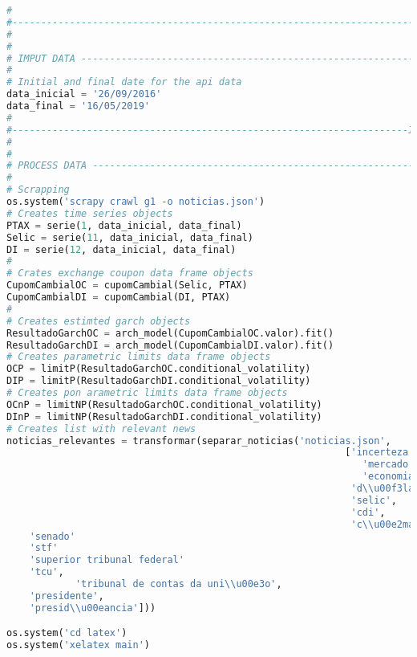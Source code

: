 \begin{lstlisting}[language=Python]
#
#------------------------------------------------------------------------OBJECTS
#
#
# IMPUT DATA -------------------------------------------------------------------
#
# Initial and final date for the api data
data_inicial = '26/09/2016'
data_final = '16/05/2019'
#
#---------------------------------------------------------------------INPUT DATA
#
#
# PROCESS DATA -----------------------------------------------------------------
#
# Scrapping
os.system('scrapy crawl g1 -o noticias.json')
# Creates time series objects
PTAX = serie(1, data_inicial, data_final)
Selic = serie(11, data_inicial, data_final)
DI = serie(12, data_inicial, data_final)
#
# Crates exchange coupon data frame objects
CupomCambialOC = cupomCambial(Selic, PTAX)
CupomCambialDI = cupomCambial(DI, PTAX)
#
# Creates estimted garch objects
ResultadoGarchOC = arch_model(CupomCambialOC.valor).fit()
ResultadoGarchDI = arch_model(CupomCambialDI.valor).fit()
# Creates parametric limits data frame objects
OCP = limitP(ResultadoGarchOC.conditional_volatility)
DIP = limitP(ResultadoGarchDI.conditional_volatility)
# Creates pon arametric limits data frame objects
OCnP = limitNP(ResultadoGarchOC.conditional_volatility)
DInP = limitNP(ResultadoGarchDI.conditional_volatility)
# Creates list with relevant news
noticias_relevantes = transformar(separar_noticias('noticias.json',
												           ['incerteza',
													          'mercado',
													          'economia',
												            'd\\u00f3lar',
										        		    'selic',
										        		    'cdi',
												            'c\\u00e2mara',
    'senado'
    'stf'
    'superior tribunal federal'
    'tcu',
            'tribunal de contas da uni\\u00e3o',
    'presidente',
    'presid\\u00eancia']))

os.system('cd latex')
os.system('xelatex main')


\end{lstlisting}
